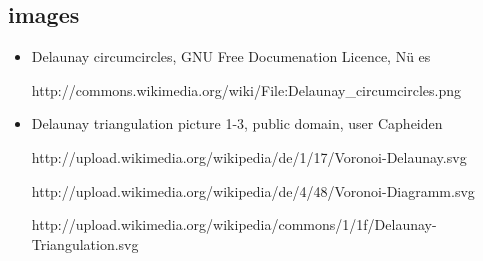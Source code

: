 \documentclass[a4paper,12pt]{article}
\begin{document}
\subsection*{images}
\begin{itemize}
\item
Delaunay circumcircles, GNU Free Documenation Licence, N\"u es

http://commons.wikimedia.org/wiki/File:Delaunay\_circumcircles.png

\item
Delaunay triangulation picture 1-3, public domain, user Capheiden 

http://upload.wikimedia.org/wikipedia/de/1/17/Voronoi-Delaunay.svg

http://upload.wikimedia.org/wikipedia/de/4/48/Voronoi-Diagramm.svg

http://upload.wikimedia.org/wikipedia/commons/1/1f/Delaunay-Triangulation.svg

\end{itemize}
\end{document}
